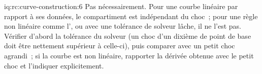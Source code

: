 \begin{solution}{iq:rc:curve-construction:6}
Pas nécessairement. Pour une courbe linéaire par rapport à ses données, le compartiment est
indépendant du choc~; pour une règle non linéaire comme l', ou
avec une tolérance de solveur lâche, il ne l'est pas. Vérifier d'abord la tolérance du solveur
(un choc d'un dixième de point de base doit être nettement supérieur à celle-ci), puis comparer avec un petit choc agrandi~;
si la courbe est non linéaire, rapporter la dérivée obtenue avec le petit choc et l'indiquer explicitement.
\end{solution}
